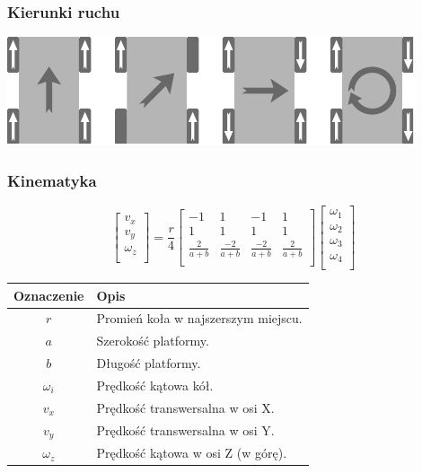 \documentclass{beamer}
\begin{document}
	\begin{frame}
		\frametitle{Kierunki ruchu}
		\centering
		\includegraphics[width=\textwidth]{graphics/dirs.pdf}
	\end{frame}
	\begin{frame}
		\frametitle{Kinematyka}
		\[
		\begin{bmatrix}
		v_x \\
		v_y \\
		\omega_z \\
		\end{bmatrix}
		=
		\frac{r}{4}
		\begin{bmatrix}
		-1 & 1 & -1 & 1 \\
		1 & 1 & 1 & 1 \\
		\frac{2}{a+b} & \frac{-2}{a+b} & \frac{-2}{a+b} & \frac{2}{a+b} \\
		\end{bmatrix}
		\begin{bmatrix}
		\omega_1 \\
		\omega_2 \\
		\omega_3 \\
		\omega_4 \\
		\end{bmatrix}
		\]
		\begin{table}
		\centering
		\begin{tabular}{c l}
		Oznaczenie & Opis \\
		\hline
		$r$ &  Promień koła w najszerszym miejscu. \\
		$a$ &  Szerokość platformy. \\
		$b$ &  Długość platformy. \\
		$\omega_i$ &  Prędkość kątowa kół. \\
		$v_x$ &  Prędkość transwersalna w osi X. \\
		$v_y$ &  Prędkość transwersalna w osi Y. \\
		$\omega_z$ &  Prędkość kątowa w osi Z (w górę). \\
		\end{tabular}
		\end{table}
	\end{frame}
	
\end{document}
